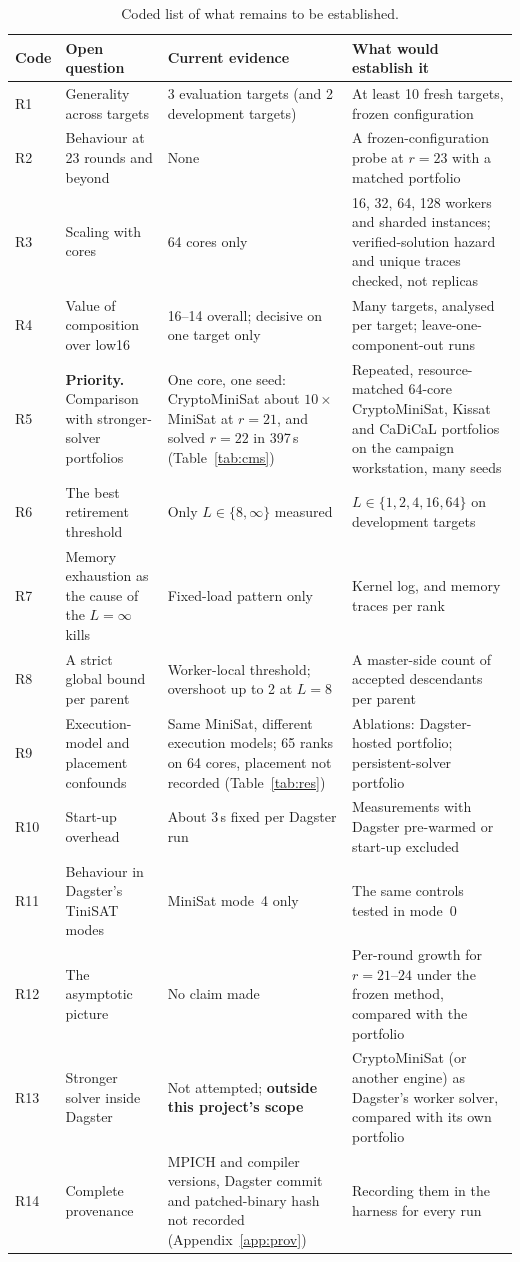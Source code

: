 \documentclass[11pt,a4paper]{article}
\begin{document}
\begin{table}[h]\centering\small
\begin{tabularx}{\textwidth}{@{}lLLL@{}}
\toprule
\textbf{Code} & \textbf{Open question} & \textbf{Current evidence} & \textbf{What would establish it}\\
\midrule
R1 & Generality across targets & 3 evaluation targets (and 2 development targets) & At least 10 fresh targets, frozen configuration\\
R2 & Behaviour at 23 rounds and beyond & None & A frozen-configuration probe at $r=23$ with a matched portfolio\\
R3 & Scaling with cores & 64 cores only & 16, 32, 64, 128 workers and sharded instances; verified-solution hazard and unique traces checked, not replicas\\
R4 & Value of composition over low16 & 16--14 overall; decisive on one target only & Many targets, analysed per target; leave-one-component-out runs\\
R5 & \textbf{Priority.} Comparison with stronger-solver portfolios & One core, one seed: CryptoMiniSat about $10\times$ MiniSat at $r=21$, and solved $r=22$ in 397\,s (Table~\ref{tab:cms}) & Repeated, resource-matched 64-core CryptoMiniSat, Kissat and CaDiCaL portfolios on the campaign workstation, many seeds\\
R6 & The best retirement threshold & Only $L\in\{8,\infty\}$ measured & $L\in\{1,2,4,16,64\}$ on development targets\\
R7 & Memory exhaustion as the cause of the $L=\infty$ kills & Fixed-load pattern only & Kernel log, and memory traces per rank\\
R8 & A strict global bound per parent & Worker-local threshold; overshoot up to 2 at $L=8$ & A master-side count of accepted descendants per parent\\
R9 & Execution-model and placement confounds & Same MiniSat, different execution models; 65 ranks on 64 cores, placement not recorded (Table~\ref{tab:res}) & Ablations: Dagster-hosted portfolio; persistent-solver portfolio\\
R10 & Start-up overhead & About 3\,s fixed per Dagster run & Measurements with Dagster pre-warmed or start-up excluded\\
R11 & Behaviour in Dagster's TiniSAT modes & MiniSat mode~4 only & The same controls tested in mode~0\\
R12 & The asymptotic picture & No claim made & Per-round growth for $r=21$--$24$ under the frozen method, compared with the portfolio\\
R13 & Stronger solver inside Dagster & Not attempted; \textbf{outside this project's scope} & CryptoMiniSat (or another engine) as Dagster's worker solver, compared with its own portfolio\\
R14 & Complete provenance & MPICH and compiler versions, Dagster commit and patched-binary hash not recorded (Appendix~\ref{app:prov}) & Recording them in the harness for every run\\
\bottomrule
\end{tabularx}
\caption{Coded list of what remains to be established.}
\label{tab:open}
\end{table}
\end{document}

